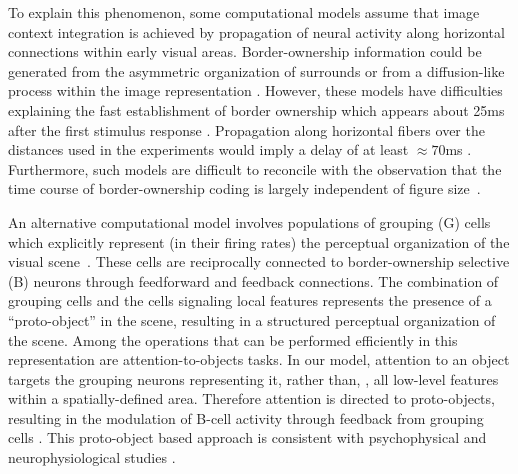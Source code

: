 %
 To explain this phenomenon, some computational models assume that
image context integration is achieved by propagation of neural
activity along horizontal connections within early visual
areas. Border-ownership information could be generated from the 
asymmetric organization of surrounds \citep{Nishimura_Sakai04,
 Nishimura_Sakai05,Sakai_etal12} or from a diffusion-like process
within the image representation \citep{Grossberg94, Sajda_Finkel95,
Baek_Sajda05, Kikuchi_Akashi01, Pao_etal99,
Zhaoping05}. However, these models have difficulties explaining the
fast establishment of border ownership which appears about 25ms after
the first stimulus response \citep{Zhou_etal00}.
%
 Propagation along horizontal fibers over the
distances used in the experiments would imply a delay of at least $\approx70$ms \citep[][based on the conduction velocity of horizontal fibers in primate V1 cortex; we are not aware of corresponding data for V2]{Girard_etal01}. Furthermore, such models are difficult to reconcile with the observation that the time course of border-ownership coding is largely independent of figure size~\citep{Sugihara_etal11}.

An alternative computational model involves populations of grouping
(G) cells which explicitly represent (in their firing rates) the
perceptual organization of the visual
scene~\citep{Craft_etal07}. These cells are reciprocally connected to
border-ownership selective (B) neurons through feedforward and
feedback connections.  The combination of grouping cells and the cells
signaling local features represents the presence of a ``proto-object''
\citep{Rensink00a} in the scene, resulting in a structured perceptual
organization of the scene. Among the operations that can be performed
efficiently in this representation are attention-to-objects tasks. In
our model, attention to an object targets the grouping neurons
representing it, rather than, \eg, all low-level features within a
spatially-defined area. Therefore attention is directed to
proto-objects, resulting in the modulation of B-cell activity through
feedback from grouping cells \citep{Mihalas_etal11b}.  This
proto-object based approach is consistent with psychophysical and
neurophysiological studies
\citep[\eg][]{Duncan84,Egly_etal94,Scholl01,Kimchi_etal07,Qiu_etal07,Ho_Yeh09,Poort_etal12}.

